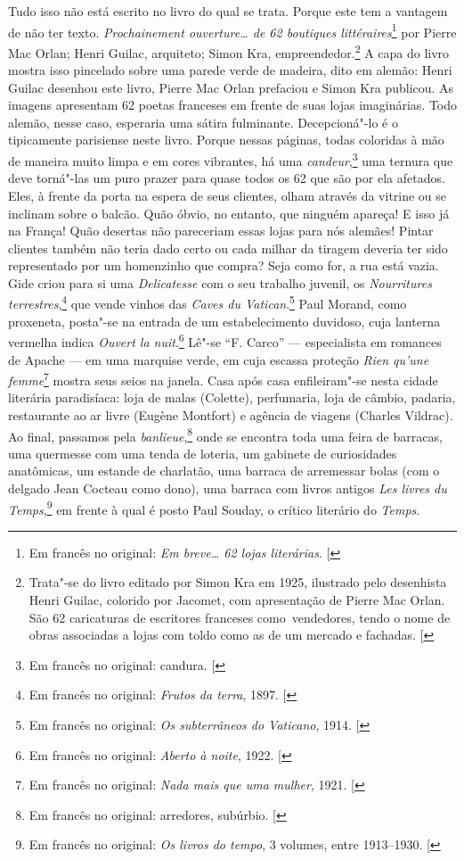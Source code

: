 Tudo isso não está escrito no livro do qual se trata. Porque este tem
a vantagem de não ter texto. \emph{Prochainement ouverture\ldots{} de 62 boutiques littéraires}\footnote{Em francês no original: \emph{Em breve\ldots{} 62 lojas literárias}. {[}\versal{N.~T.}{]}} 
por Pierre Mac Orlan; Henri Guilac, arquiteto; Simon Kra,
empreendedor.\footnote{Trata"-se do
  livro editado por Simon Kra em 1925, ilustrado pelo desenhista Henri
  Guilac, colorido por Jacomet, com apresentação de Pierre Mac Orlan.
  São 62 caricaturas de escritores franceses como~vendedores, tendo o
  nome de obras associadas a lojas com toldo como as de um mercado e
  fachadas. {[}\versal{N.~O.}{]}} A capa do livro mostra isso pincelado sobre uma
parede verde de madeira, dito em alemão: Henri Guilac desenhou este
livro, Pierre Mac Orlan prefaciou e Simon Kra publicou. As imagens
apresentam 62 poetas franceses em frente de suas lojas imaginárias. Todo
alemão, nesse caso, esperaria uma sátira fulminante. Decepcioná"-lo é o
tipicamente parisiense neste livro. Porque nessas páginas, todas
coloridas à mão de maneira muito limpa e em cores vibrantes, há uma
\emph{candeur},\footnote{Em francês no original: candura. {[}\versal{N.~T.}{]}}
uma ternura que deve torná"-las um puro prazer para quase todos os 62 que
são por ela afetados. Eles, à frente da porta na espera de seus
clientes, olham através da vitrine ou se inclinam sobre o balcão. Quão
óbvio, no entanto, que ninguém apareça! E isso já na França! Quão
desertas não pareceriam essas lojas para nós alemães! Pintar clientes
também não teria dado certo ou cada milhar da tiragem deveria ter sido
representado por um homenzinho que compra? Seja como for, a rua está
vazia. Gide criou para si uma \emph{Delicatesse} com o seu trabalho
juvenil, os \emph{Nourritures terrestres},\footnote{Em francês no original: \emph{Frutos da
  terra}, 1897. {[}\versal{N.~T.}{]}} que vende vinhos das \emph{Caves
du Vatican}.\footnote{Em francês no original: \emph{Os subterrâneos do Vaticano}, 1914.
  {[}\versal{N.~T.}{]}} Paul Morand, como proxeneta, posta"-se na entrada de um
estabelecimento duvidoso, cuja lanterna vermelha indica \emph{Ouvert la
nuit}.\footnote{Em francês no original: \emph{Aberto à noite}, 1922. {[}\versal{N.~T.}{]}} Lê"-se
``F. Carco'' --- especialista em romances de Apache --- em uma marquise
verde, em cuja escassa proteção \emph{Rien qu'une femme}\footnote{Em francês no original:
\emph{Nada mais que uma mulher}, 1921. {[}\versal{N.~T.}{]}} mostra seus seios na
janela. Casa após casa enfileiram"-se nesta cidade literária paradisíaca:
loja de malas (Colette), perfumaria, loja de câmbio, padaria,
restaurante ao ar livre (Eugène Montfort) e agência de viagens (Charles
Vildrac). Ao final, passamos pela \emph{banlieue},\footnote{Em francês no original: arredores, subúrbio. {[}\versal{N.~T.}{]}} onde se encontra toda
uma feira de barracas, uma quermesse com uma tenda de loteria, um
gabinete de curiosidades anatômicas, um estande de charlatão, uma
barraca de arremessar bolas (com o delgado Jean Cocteau como dono), uma
barraca com livros antigos \emph{Les livres du Temps},\footnote{Em francês no original:
\emph{Os livros do tempo}, 3 volumes, entre 1913--1930. {[}\versal{N.~T.}{]}} em frente à
qual é posto Paul Souday, o crítico literário do \emph{Temps}.

